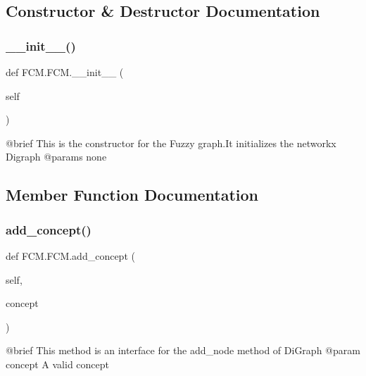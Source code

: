 \subsection{Constructor \& Destructor Documentation}
\hypertarget{class_f_c_m_1_1_f_c_m_aba98e39a31a4bd9cb8eb8887dd98bbc0}{}\label{class_f_c_m_1_1_f_c_m_aba98e39a31a4bd9cb8eb8887dd98bbc0} 
\subsubsection{\texorpdfstring{\+\_\+\+\_\+init\+\_\+\+\_\+()}{\_\_init\_\_()}}
{\footnotesize\ttfamily def F\+C\+M.\+F\+C\+M.\+\_\+\+\_\+init\+\_\+\+\_\+ (\begin{DoxyParamCaption}\item[{}]{self }\end{DoxyParamCaption})}

\begin{DoxyVerb}@brief  This is the constructor for the Fuzzy graph.It initializes the networkx Digraph
@params none
\end{DoxyVerb}
 

\subsection{Member Function Documentation}
\hypertarget{class_f_c_m_1_1_f_c_m_a57dff35d123327af6d02f335a49c4177}{}\label{class_f_c_m_1_1_f_c_m_a57dff35d123327af6d02f335a49c4177} 
\subsubsection{\texorpdfstring{add\+\_\+concept()}{add\_concept()}}
{\footnotesize\ttfamily def F\+C\+M.\+F\+C\+M.\+add\+\_\+concept (\begin{DoxyParamCaption}\item[{}]{self,  }\item[{}]{concept }\end{DoxyParamCaption})}

\begin{DoxyVerb}@brief This method is an interface for the add_node method of DiGraph
@param concept A valid concept\end{DoxyVerb}
 \hypertarget{class_f_c_m_1_1_f_c_m_a4e32ab9228e8f678e6892092d643062d}{}\label{class_f_c_m_1_1_f_c_m_a4e32ab9228e8f678e6892092d643062d} 

